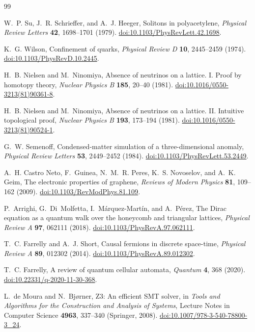 \documentclass[a4paper,onecolumn,11pt]{quantumarticle}
\begin{document}
\begin{thebibliography}{99}

W.~P. Su, J.~R. Schrieffer, and A.~J. Heeger,
Solitons in polyacetylene,
\emph{Physical Review Letters} \textbf{42}, 1698--1701 (1979).
\href{https://doi.org/10.1103/PhysRevLett.42.1698}{doi:10.1103/PhysRevLett.42.1698}.

K.~G. Wilson,
Confinement of quarks,
\emph{Physical Review D} \textbf{10}, 2445--2459 (1974).
\href{https://doi.org/10.1103/PhysRevD.10.2445}{doi:10.1103/PhysRevD.10.2445}.

H.~B. Nielsen and M.~Ninomiya,
Absence of neutrinos on a lattice. I. Proof by homotopy theory,
\emph{Nuclear Physics B} \textbf{185}, 20--40 (1981).
\href{https://doi.org/10.1016/0550-3213(81)90361-8}{doi:10.1016/0550-3213(81)90361-8}.

H.~B. Nielsen and M.~Ninomiya,
Absence of neutrinos on a lattice. II. Intuitive topological proof,
\emph{Nuclear Physics B} \textbf{193}, 173--194 (1981).
\href{https://doi.org/10.1016/0550-3213(81)90524-1}{doi:10.1016/0550-3213(81)90524-1}.

G.~W. Semenoff,
Condensed-matter simulation of a three-dimensional anomaly,
\emph{Physical Review Letters} \textbf{53}, 2449--2452 (1984).
\href{https://doi.org/10.1103/PhysRevLett.53.2449}{doi:10.1103/PhysRevLett.53.2449}.

A.~H. Castro Neto, F.~Guinea, N.~M.~R. Peres, K.~S. Novoselov, and A.~K. Geim,
The electronic properties of graphene,
\emph{Reviews of Modern Physics} \textbf{81}, 109--162 (2009).
\href{https://doi.org/10.1103/RevModPhys.81.109}{doi:10.1103/RevModPhys.81.109}.

P.~Arrighi, G.~Di~Molfetta, I.~M\'arquez-Mart\'in, and A.~P\'erez,
The Dirac equation as a quantum walk over the honeycomb and triangular lattices,
\emph{Physical Review A} \textbf{97}, 062111 (2018).
\href{https://doi.org/10.1103/PhysRevA.97.062111}{doi:10.1103/PhysRevA.97.062111}.

T.~C. Farrelly and A.~J. Short,
Causal fermions in discrete space-time,
\emph{Physical Review A} \textbf{89}, 012302 (2014).
\href{https://doi.org/10.1103/PhysRevA.89.012302}{doi:10.1103/PhysRevA.89.012302}.

T.~C. Farrelly,
A review of quantum cellular automata,
\emph{Quantum} \textbf{4}, 368 (2020).
\href{https://doi.org/10.22331/q-2020-11-30-368}{doi:10.22331/q-2020-11-30-368}.

L.~de Moura and N.~Bj{\o}rner,
Z3: An efficient SMT solver,
in \emph{Tools and Algorithms for the Construction and Analysis of Systems},
Lecture Notes in Computer Science \textbf{4963}, 337--340 (Springer, 2008).
\href{https://doi.org/10.1007/978-3-540-78800-3_24}{doi:10.1007/978-3-540-78800-3\_24}.

\end{thebibliography}
\end{document}
